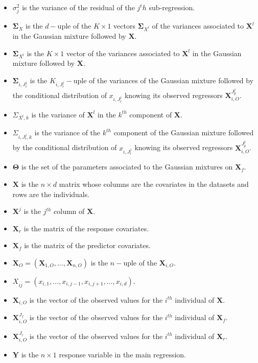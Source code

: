\documentclass[12pt,a4paper]{report}
\begin{document}
\begin{itemize}
	\item $\sigma_j^2$ is the variance of the residual of the $j^th$ sub-regression.	
	\item $\boldsymbol{\Sigma}_X$ is the $d-$uple of the $K \times 1 $ vectors $\boldsymbol{\Sigma}_{X^l}$ of the variances associated to $\boldsymbol{X}^l$ in the Gaussian mixture followed by $\boldsymbol{X}$.
	\item $\boldsymbol{\Sigma}_{X^l}$ is the $K \times 1 $ vector of the variances associated to $\boldsymbol{X}^l$ in the Gaussian mixture followed by $\boldsymbol{X}$.
	\item $\boldsymbol{\Sigma}_{i,J_r^j}$ is the $K_{i,J_r^j}-$uple of the variances of the Gaussian mixture followed by the conditional distribution of $x_{i,J_r^j}$ knowing its observed regressors $\boldsymbol{X}_{i,O}^{J_p^j}$.	
	\item $\Sigma_{X^l,k}$ is the variance of $\boldsymbol{X}^l$ in the $k^{th}$ component of $\boldsymbol{X}$.
	\item $\Sigma_{i,J_r^j,k}$ is the variance of the $k^{th}$ component of the Gaussian mixture followed by the conditional distribution of $x_{i,J_r^j}$ knowing its observed regressors $\boldsymbol{X}_{i,O}^{J_p^j}$.
	\item $\boldsymbol{\Theta}$ is the set of the parameters associated to the Gaussian mixtures on $\boldsymbol{X}_f$.	
	\item $\boldsymbol{X}$ is the $n\times d$ matrix whose columns are the covariates in the datasets and rows are the individuals.
	\item $\boldsymbol{X}^j$ is the $j^{th}$ column of $\boldsymbol{X}$.
	\item $\boldsymbol{X}_r$ is the matrix of the response covariates.
	\item $\boldsymbol{X}_f$ is the matrix of the predictor covariates.
	\item $\boldsymbol{X}_O=(\boldsymbol{X}_{1,O},\dots,\boldsymbol{X}_{n,O})$ is the $n-$uple of the $\boldsymbol{X}_{i,O}$.
	\item $X_{\bar{ij}}=(x_{i,1},\dots, x_{i,j-1},x_{i,j+1},\dots, x_{i,d})$.
	\item $\boldsymbol{X}_{i,O}$ is the vector of the observed values for the  $i^{th}$ individual of $\boldsymbol{X}$.
	\item $\boldsymbol{X}_{i,O}^{J_f}$ is the vector of the observed values for the  $i^{th}$ individual of $\boldsymbol{X}_f$.
	\item $\boldsymbol{X}_{i,O}^{J_r}$ is the vector of the observed values for the  $i^{th}$ individual of $\boldsymbol{X}_r$.
	\item $\boldsymbol{Y}$ is the $n\times 1$ response variable in the main regression.
\end{itemize}
		  
\end{document}
